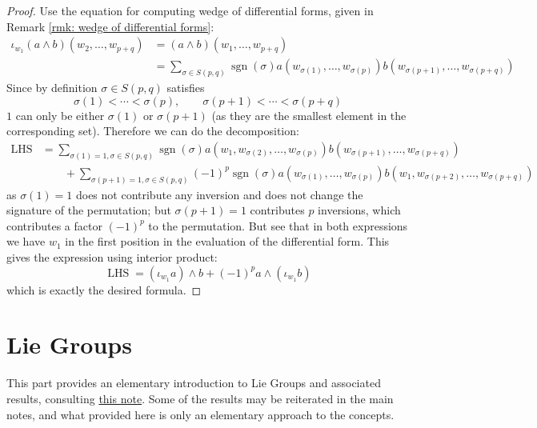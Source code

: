 \documentclass{article}
\begin{document}
\begin{proof}
    Use the equation for computing wedge of differential forms, given in Remark \ref{rmk: wedge of differential forms}:
    \begin{align*}
        \iota_{w_1}(a \wedge b)(w_2, \dots, w_{p+q})
        & = (a \wedge b) (w_1, \dots, w_{p+q}) \\
        & = \sum_{\sigma \in S(p, q)} \operatorname{sgn}(\sigma) a(w_{\sigma(1)}, \dots, w_{\sigma(p)}) b(w_{\sigma(p+1)}, \dots, w_{\sigma(p+q)}) 
    \end{align*}
    Since by definition $\sigma \in S(p, q)$ satisfies
    \[
        \sigma(1) < \cdots < \sigma(p), \qquad \sigma(p+1) < \cdots < \sigma(p+q)
    \]
    $1$ can only be either $\sigma(1)$ or $\sigma(p+1)$ (as they are the smallest element in the corresponding set). Therefore we can do the decomposition:
    \begin{align*}
        \operatorname{LHS} 
        & = \sum_{\sigma(1) = 1, \sigma \in S(p, q)} \operatorname{sgn}(\sigma) a(w_{1}, w_{\sigma(2)}, \dots, w_{\sigma(p)}) b(w_{\sigma(p+1)}, \dots, w_{\sigma(p+q)}) \\
        & \qquad + \sum_{\sigma(p+1) = 1, \sigma \in S(p, q)} (-1)^p\operatorname{sgn}(\sigma) a(w_{\sigma(1)}, \dots, w_{\sigma(p)}) b(w_1, w_{\sigma(p+2)}, \dots, w_{\sigma(p+q)}) 
    \end{align*}
    as $\sigma(1) = 1$ does not contribute any inversion and does not change the signature of the permutation; but $\sigma(p+1) = 1$ contributes $p$ inversions, which contributes a factor $(-1)^p$ to the permutation. But see that in both expressions we have $w_1$ in the first position in the evaluation of the differential form. This gives the expression using interior product:
    \[
        \operatorname{LHS} = (\iota_{w_1} a) \wedge b + (-1)^p a \wedge (\iota_{w_1} b)
    \]
    which is exactly the desired formula. 
\end{proof}

\section{Lie Groups}

\textstart
This part provides an elementary introduction to Lie Groups and associated results, consulting \href{https://scholar.rose-hulman.edu/rhumj/vol15/iss2/5}{this note}. Some of the results may be reiterated in the main notes, and what provided here is only an elementary approach to the concepts. 
\end{document}
